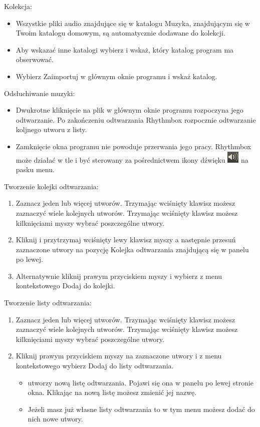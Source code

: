 Kolekcja:
\begin{itemize}
\item Wszystkie pliki audio znajdujące się w katalogu Muzyka, znajdującym się w Twoim katalogu domowym, są automatycznie dodawane do kolekcji.
\item Aby wskazać inne katalogi wybierz  i wskaż, który katalog program ma obserwować.
\item Wybierz \textcolor{ubuntu_orange}{Zaimportuj} w głównym oknie programu i wskaż katalog.
\end{itemize}
Odsłuchiwanie muzyki:
\begin{itemize}
\item Dwukrotne kliknięcie na plik w głównym oknie programu rozpoczyna jego odtwarzanie. Po zakończeniu odtwarzania Rhythmbox rozpocznie odtwarzanie koljnego utworu z listy.
\item Zamknięcie okna programu nie powoduje przerwania jego pracy. Rhythmbox może działać w tle i być sterowany za pośrednictwem ikony dźwięku \includegraphics{images/ikony_dzwiek.png} na pasku menu.
\end{itemize}
Tworzenie kolejki odtwarzania:
\begin{enumerate}
\item Zaznacz jeden lub więcej utworów. Trzymając wciśnięty klawisz  możesz zaznaczyć wiele kolejnych utworów. Trzymając wciśnięty klawisz  możesz kilknięciami myszy wybrać poszczególne utwory.
\item Kliknij i przytrzymaj wciśnięty lewy klawisz myszy a następnie przesuń zaznaczone utwory na pozycję \textcolor{ubuntu_orange}{Kolejka odtwarzania} znajdującą się w panelu po lewej.
\item Alternatywnie kliknij prawym przyciskiem myszy i wybierz z menu kontekstowego \textcolor{ubuntu_orange}{Dodaj do kolejki}.
\end{enumerate}
Tworzenie listy odtwarzania:
\begin{enumerate}
\item Zaznacz jeden lub więcej utworów. Trzymając wciśnięty klawisz  możesz zaznaczyć wiele kolejnych utworów. Trzymając wciśnięty klawisz  możesz kilknięciami myszy wybrać poszczególne utwory.
\item  Kliknij prawym przyciskiem myszy na zaznaczone utwory i z menu kontekstowego wybierz \textcolor{ubuntu_orange}{Dodaj do listy odtwarzania}.
\begin{itemize}
\item {} utworzy nową listę odtwarzania. Pojawi się ona w panelu po lewej stronie okna. Klikając na nową listę możesz zmienić jej nazwę.
\item Jeżeli masz już własne listy odtwarzania to w tym menu możesz dodać do nich nowe utwory.
\end{itemize}
\end{enumerate}